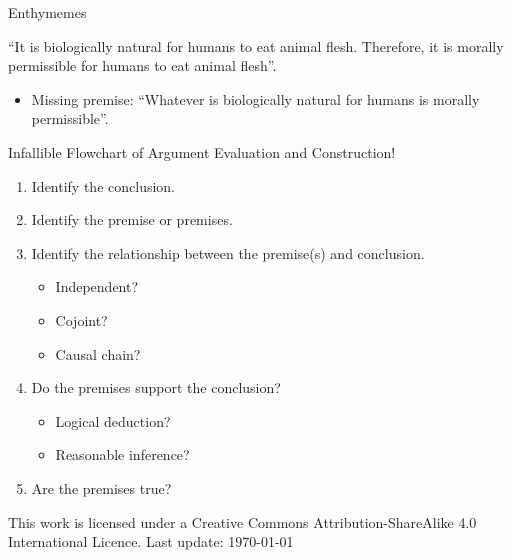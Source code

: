 \documentclass{beamer}
\begin{document}
\begin{frame}{Enthymemes}

``It is biologically natural for humans to eat animal flesh. Therefore, it is morally permissible for humans to eat animal flesh''.

\begin{itemize}
\item Missing premise: ``Whatever is biologically natural for humans is morally permissible''.
\end{itemize}

\end{frame}



\begin{frame}{Infallible Flowchart of Argument Evaluation and Construction!}
\begin{enumerate}
\item Identify the conclusion.
\item Identify the premise or premises.
\item Identify the relationship between the premise(s) and conclusion.
\begin{itemize}
\item Independent?
\item Cojoint?
\item Causal chain?
\end{itemize}
\item Do the premises support the conclusion?
\begin{itemize}
\item Logical deduction?
\item Reasonable inference?
\end{itemize}
\item Are the premises true?
\end{enumerate}

\vspace{12pt}

\tiny
This work is licensed under a Creative Commons Attribution-ShareAlike
4.0 International Licence. Last update: \today

\end{frame}
\end{document}
